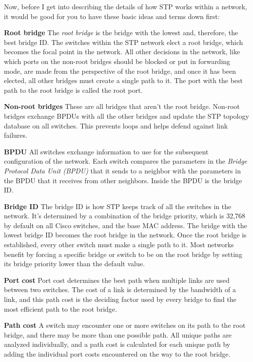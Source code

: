 Now, before I get into describing the details of how STP works within a
network, it would be good for you to have these basic ideas and terms
down first:

\textbf{Root bridge} The \emph{root bridge} is the bridge with the
lowest and, therefore, the best bridge ID. The switches within the STP
network elect a root bridge, which becomes the focal
point in the network.
All other decisions in the network, like which ports on the non-root
bridges should be blocked or put in forwarding mode, are made from the
perspective of the root bridge, and once it has been elected, all other
bridges must create a single path to it. The port with the best path to
the root bridge is called the root port.

\textbf{Non-root bridges} These are all bridges that aren't the root
bridge. Non-root bridges exchange BPDUs with all the other bridges and
update the STP topology database on all switches. This prevents loops
and helps defend against link failures.

\textbf{BPDU} All switches exchange information to use for the
subsequent configuration of the network. Each switch compares the
parameters in the \emph{Bridge Protocol Data Unit (BPDU)} that it sends
to a neighbor with the parameters in the BPDU that it receives from
other neighbors. Inside the BPDU is the bridge ID.

\textbf{Bridge ID} The bridge ID is how STP keeps track of all the
switches in the network. It's determined by a combination of the bridge
priority, which is 32,768 by default on all Cisco switches, and the base
MAC address. The bridge with the lowest bridge ID becomes the root
bridge in the network. Once the root bridge is established, every other
switch must make a single path to it. Most networks benefit by forcing a
specific bridge or switch to be on the root bridge by setting its bridge
priority lower than the default value.

\textbf{Port cost} Port cost determines the best path when multiple
links are used between two switches. The cost of a link is determined by
the bandwidth of a link, and this path cost is the deciding factor used
by every bridge to find the most efficient path to the root bridge.

\textbf{Path cost} A switch may encounter one or more switches on its
path to the root bridge, and there may be more than one possible path.
All unique paths are analyzed individually, and a path cost is
calculated for each unique path by adding the individual port costs
encountered on the way to the root bridge.

